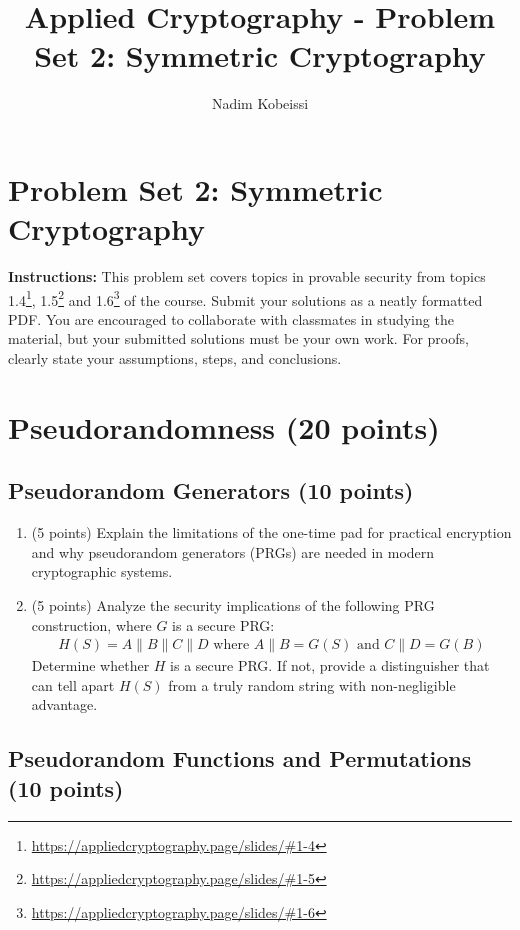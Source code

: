 \documentclass[10pt,a4paper,american]{exam}
\title{Applied Cryptography - Problem Set 2: Symmetric Cryptography}
\author{Nadim Kobeissi}
\begin{document}
\classhandoutheader
\section*{Problem Set 2: Symmetric Cryptography}

\begin{tcolorbox}[colframe=OliveGreen!30!white,colback=OliveGreen!5!white]
	\textbf{Instructions:} This problem set covers topics in provable security from topics 1.4\footnote{\url{https://appliedcryptography.page/slides/\#1-4}}, 1.5\footnote{\url{https://appliedcryptography.page/slides/\#1-5}} and 1.6\footnote{\url{https://appliedcryptography.page/slides/\#1-6}} of the course. Submit your solutions as a neatly formatted PDF. You are encouraged to collaborate with classmates in studying the material, but your submitted solutions must be your own work. For proofs, clearly state your assumptions, steps, and conclusions.
\end{tcolorbox}

\section{Pseudorandomness (20 points)}

\subsection{Pseudorandom Generators (10 points)}

\begin{enumerate}
	\item (5 points) Explain the limitations of the one-time pad for practical encryption and why pseudorandom generators (PRGs) are needed in modern cryptographic systems.

	\item (5 points) Analyze the security implications of the following PRG construction, where $G$ is a secure PRG:
	      \begin{align*}
		      H(S) = A \| B \| C \| D \text{ where } A \| B = G(S) \text{ and } C \| D = G(B)
	      \end{align*}
	      Determine whether $H$ is a secure PRG. If not, provide a distinguisher that can tell apart $H(S)$ from a truly random string with non-negligible advantage.
\end{enumerate}

\subsection{Pseudorandom Functions and Permutations (10 points)}
\end{document}

